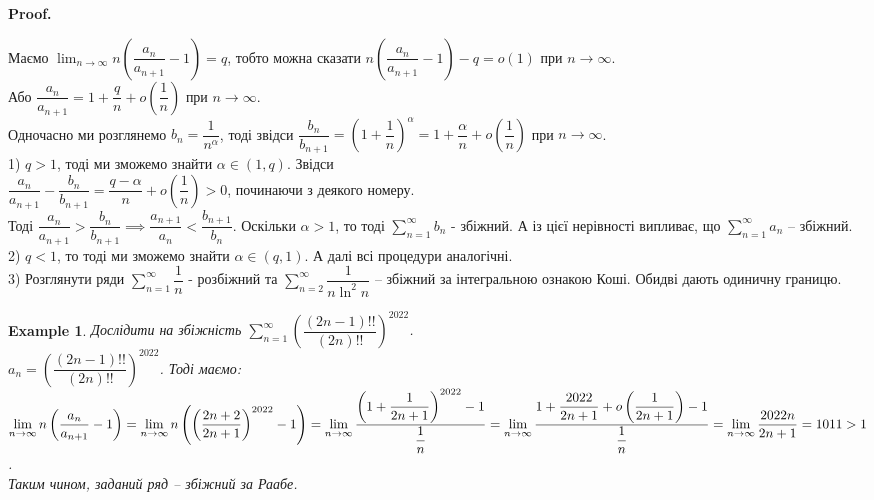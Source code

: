\documentclass[a4paper, 10pt]{article}
\makeatletter
\def\huge{\displaystyle}
\def\qed{$\blacksquare$}
\theoremstyle{theoremdd}
\theoremstyle{theoremdd}
\theoremstyle{theoremdd}
\theoremstyle{theoremdd}
\theoremstyle{theoremdd}
\newtheorem{example}[theorem]{Example}
\theoremstyle{theoremdd}
\theoremstyle{theoremdd}
\theoremstyle{theoremdd}
\theoremstyle{theoremdd}
\renewenvironment{proof}[1][Proof.\\]{\par
\pushQED{\hfill \qed}%
\normalfont \topsep6\p@\@plus6\p@\relax
\trivlist
\item\relax
{\bfseries
#1\@addpunct{.}}\hspace\labelsep\ignorespaces
}{%
\popQED\endtrivlist\@endpefalse
}
\makeatother
\begin{document}
\begin{proof}
Маємо $\huge\lim_{n \to \infty} n \left( \dfrac{a_n}{a_{n+1}} - 1 \right) = q$, тобто можна сказати $n \left( \dfrac{a_n}{a_{n+1}} - 1 \right) - q = o(1)$ при $n \to \infty$.\\
Або $\dfrac{a_n}{a_{n+1}} = 1 + \dfrac{q}{n} + o\left( \dfrac{1}{n} \right)$ при $n \to \infty$.\\
Одночасно ми розглянемо $b_n = \dfrac{1}{n^\alpha}$, тоді звідси $\dfrac{b_n}{b_{n+1}} = \left( 1 + \dfrac{1}{n} \right)^\alpha = 1 + \dfrac{\alpha}{n} + o\left( \dfrac{1}{n} \right)$ при $n \to \infty$.
\bigskip \\
1) $q > 1$, тоді ми зможемо знайти $\alpha \in (1,q)$. Звідси\\
$\dfrac{a_n}{a_{n+1}} - \dfrac{b_n}{b_{n+1}} = \dfrac{q-\alpha}{n} + o \left( \dfrac{1}{n} \right) > 0$, починаючи з деякого номеру.\\
Тоді $\dfrac{a_n}{a_{n+1}} > \dfrac{b_n}{b_{n+1}} \implies \dfrac{a_{n+1}}{a_n} < \dfrac{b_{n+1}}{b_n}$. Оскільки $\alpha > 1$, то тоді $\huge\sum_{n=1}^\infty b_n$ - збіжний. А із цієї нерівності випливає, що $\huge\sum_{n=1}^\infty a_n$ -- збіжний.
\bigskip \\
2) $q < 1$, то тоді ми зможемо знайти $\alpha \in (q,1)$. А далі всі процедури аналогічні.
\bigskip \\
3) Розглянути ряди $\huge\sum_{n=1}^\infty \dfrac{1}{n}$ - розбіжний та $\huge\sum_{n=2}^\infty \dfrac{1}{n \ln^2 n}$ -- збіжний за інтегральною ознакою Коші. Обидві дають одиничну границю.
\end{proof}

\begin{example}
Дослідити на збіжність $\huge\sum_{n=1}^\infty \left(\dfrac{(2n-1)!!}{(2n)!!} \right)^{2022}$.\\
$a_n = \left(\dfrac{(2n-1)!!}{(2n)!!}\right)^{2022}$. Тоді маємо:\\
$\huge\lim_{n \to \infty} n \left( \dfrac{a_n}{a_{n+1}} - 1 \right) = \lim_{n \to \infty} n \left( \left( \dfrac{2n+2}{2n+1} \right)^{2022} -1 \right) = \lim_{n \to \infty} \dfrac{\left( 1 + \dfrac{1}{2n+1} \right)^{2022} - 1}{\dfrac{1}{n}} = \lim_{n \to \infty} \dfrac{1 + \dfrac{2022}{2n+1} + o\left( \dfrac{1}{2n+1} \right) - 1}{\dfrac{1}{n}} \\
= \lim_{n \to \infty} \dfrac{2022n}{2n+1} = 1011 > 1$.\\
Таким чином, заданий ряд -- збіжний за Раабе.
\end{example}
\end{document}
